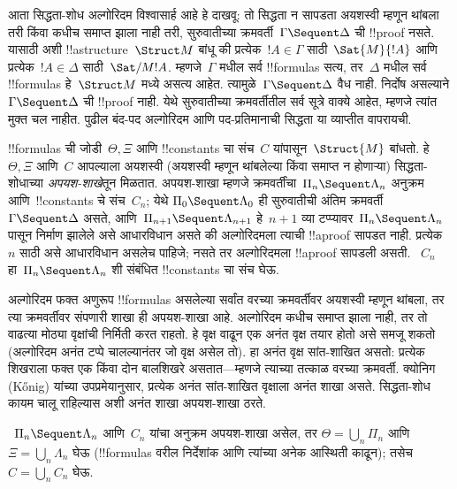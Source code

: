 \documentclass[../../../include/open-logic-section]{subfiles}
\begin{document}


आता सिद्धता-शोध अल्गोरिदम विश्वासार्ह आहे हे दाखवू:
तो सिद्धता न सापडता अयशस्वी म्हणून थांबला तरी किंवा कधीच समाप्त झाला नाही तरी,
सुरुवातीच्या क्रमवर्ती~$\Gamma \Sequent \Delta$ ची
!!{proof} नसते. यासाठी अशी !!a{structure}~$\Struct M$
बांधू की प्रत्येक~$!A \in \Gamma$ साठी~$\Sat{M}{!A}$
आणि प्रत्येक~$!A \in \Delta$ साठी~$\Sat/{M}{!A}$.
म्हणजे~$\Gamma$ मधील सर्व !!{formula}s सत्य,
तर~$\Delta$ मधील सर्व !!{formula}s हे~$\Struct M$
मध्ये असत्य आहेत. त्यामुळे~$\Gamma \Sequent \Delta$
वैध नाही.  निर्दोष असल्याने
$\Gamma \Sequent \Delta$ ची !!{proof} नाही.
येथे सुरुवातीच्या क्रमवर्तीतील सर्व सूत्रे वाक्ये आहेत,
म्हणजे त्यांत मुक्त चल नाहीत. पुढील बंद-पद अल्गोरिदम
आणि पद-प्रतिमानाची सिद्धता या व्याप्तीत वापरायची.

!!{formula}s ची जोडी~$\Theta, \Xi$ आणि
!!{constant}s चा संच~$C$ यांपासून~$\Struct{M}$ बांधतो.
हे~$\Theta, \Xi$ आणि~$C$ आपल्याला अयशस्वी
(अयशस्वी म्हणून थांबलेल्या किंवा समाप्त न होणाऱ्या) सिद्धता-शोधाच्या
\emph{अपयश-शाखे}तून मिळतात. अपयश-शाखा म्हणजे
क्रमवर्तींचा~$\Pi_n \Sequent \Lambda_n$ अनुक्रम
आणि~!!{constant}s चे संच~$C_n$; येथे
$\Pi_0 \Sequent \Lambda_0$ ही सुरुवातीची
अंतिम क्रमवर्ती~$\Gamma \Sequent \Delta$ असते,
आणि~$\Pi_{n+1} \Sequent \Lambda_{n+1}$
हे~$n+1$ व्या टप्प्यावर~$\Pi_n \Sequent \Lambda_n$
पासून निर्माण झालेले असे आधारविधान असते की
अल्गोरिदमला त्याची !!a{proof} सापडत नाही.
प्रत्येक~$n$ साठी असे आधारविधान असलेच पाहिजे;
नसते तर अल्गोरिदमला !!a{proof} सापडली असती.
~$C_n$ हा~$\Pi_n \Sequent \Lambda_n$
शी संबंधित !!{constant}s चा संच घेऊ.

अल्गोरिदम फक्त अणुरूप !!{formula}s असलेल्या
सर्वांत वरच्या क्रमवर्तीवर अयशस्वी म्हणून थांबला, तर त्या
क्रमवर्तीवर संपणारी शाखा ही अपयश-शाखा आहे.
अल्गोरिदम कधीच समाप्त झाला नाही, तर तो वाढत्या
मोठ्या वृक्षांची निर्मिती करत राहतो. हे वृक्ष
वाढून एक अनंत वृक्ष तयार होतो असे समजू शकतो
(अल्गोरिदम अनंत टप्पे चालल्यानंतर जो वृक्ष असेल तो).
हा अनंत वृक्ष सांत-शाखित असतो: प्रत्येक शिखराला
फक्त एक किंवा दोन बालशिखरे असतात---म्हणजे त्याच्या
तत्काळ वरच्या क्रमवर्ती. क्योनिग (K\H{o}nig)
यांच्या उपप्रमेयानुसार,
प्रत्येक अनंत सांत-शाखित वृक्षाला अनंत शाखा असते.
सिद्धता-शोध कायम चालू राहिल्यास अशी अनंत शाखा
अपयश-शाखा ठरते.

~$\Pi_n \Sequent \Lambda_n$ आणि~$C_n$
यांचा अनुक्रम अपयश-शाखा असेल, तर
$\Theta = \bigcup_n \Pi_n$ आणि~$\Xi = \bigcup_n \Lambda_n$
घेऊ (!!{formula}s वरील निर्देशांक आणि त्यांच्या
अनेक आस्थिती काढून); तसेच~$C = \bigcup_n C_n$ घेऊ.
\end{document}
